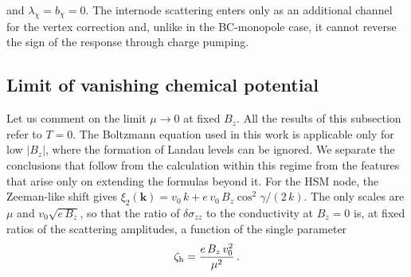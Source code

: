 \documentclass[aps,prb,onecolumn,nofootinbib,citeautoscript,10pt]{revtex4-2}
\newcommand{\bs}[1]{\boldsymbol{#1}}
\begin{document}
and $\lambda_\chi=b_\chi=0$. The internode scattering enters only as an additional channel for the vertex correction and, unlike in the BC-monopole case, it cannot reverse the sign of the response through charge pumping.

\subsection{\texorpdfstring{Limit of vanishing chemical potential}{Limit of vanishing chemical potential}}
\label{secmu0}


Let us comment on the limit $\mu\to0$ at fixed $B_z$. All the results of this subsection refer to $T=0$. The Boltzmann equation used in this work is applicable only for low $|B_z|$, where the formation of Landau levels can be ignored. We separate the conclusions that follow from the calculation within this regime from the features that arise only on extending the formulas beyond it. For the HSM node, the Zeeman-like shift gives $\xi_2(\bs k)=v_0\,k+e\,v_0\,B_z\cos^2\gamma/(2\,k)$. The only scales are $\mu$ and $v_0\sqrt{e\,B_z}$, so that the ratio of $\delta\sigma_{zz}$ to the conductivity at $B_z=0$ is, at fixed ratios of the scattering amplitudes, a function of the single parameter
\begin{align}
\zeta_{\rm h}=\frac{e\,B_z\,v_0^2}{\mu^2}\,.
\end{align}
\end{document}
